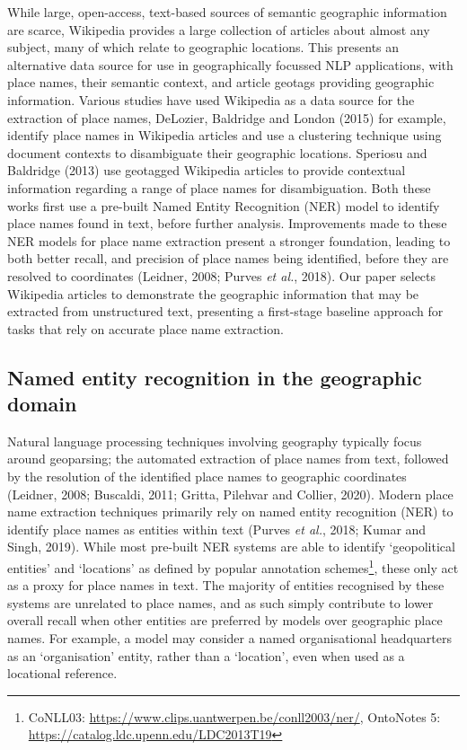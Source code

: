 \documentclass[
  letterpaper,
  11pt,
  english,
  onehalfspacing,
  headsepline]{MastersDoctoralThesis}
\begin{document}
While large, open-access, text-based sources of semantic geographic
information are scarce, Wikipedia provides a large collection of
articles about almost any subject, many of which relate to geographic
locations. This presents an alternative data source for use in
geographically focussed NLP applications, with place names, their
semantic context, and article geotags providing geographic information.
Various studies have used Wikipedia as a data source for the extraction
of place names, DeLozier, Baldridge and London (2015) for example,
identify place names in Wikipedia articles and use a clustering
technique using document contexts to disambiguate their geographic
locations. Speriosu and Baldridge (2013) use geotagged Wikipedia
articles to provide contextual information regarding a range of place
names for disambiguation. Both these works first use a pre-built Named
Entity Recognition (NER) model to identify place names found in text,
before further analysis. Improvements made to these NER models for place
name extraction present a stronger foundation, leading to both better
recall, and precision of place names being identified, before they are
resolved to coordinates (Leidner, 2008; Purves \emph{et al.}, 2018). Our
paper selects Wikipedia articles to demonstrate the geographic
information that may be extracted from unstructured text, presenting a
first-stage baseline approach for tasks that rely on accurate place name
extraction.

\hypertarget{named-entity-recognition-in-the-geographic-domain}{%
\subsection{Named entity recognition in the geographic
domain}\label{named-entity-recognition-in-the-geographic-domain}}

Natural language processing techniques involving geography typically
focus around geoparsing; the automated extraction of place names from
text, followed by the resolution of the identified place names to
geographic coordinates (Leidner, 2008; Buscaldi, 2011; Gritta, Pilehvar
and Collier, 2020). Modern place name extraction techniques primarily
rely on named entity recognition (NER) to identify place names as
entities within text (Purves \emph{et al.}, 2018; Kumar and Singh,
2019). While most pre-built NER systems are able to identify
`geopolitical entities' and `locations' as defined by popular annotation
schemes\footnote{CoNLL03:
  \url{https://www.clips.uantwerpen.be/conll2003/ner/}, OntoNotes 5:
  \url{https://catalog.ldc.upenn.edu/LDC2013T19}}, these only act as a
proxy for place names in text. The majority of entities recognised by
these systems are unrelated to place names, and as such simply
contribute to lower overall recall when other entities are preferred by
models over geographic place names. For example, a model may consider a
named organisational headquarters as an `organisation' entity, rather
than a `location', even when used as a locational reference.
\end{document}
